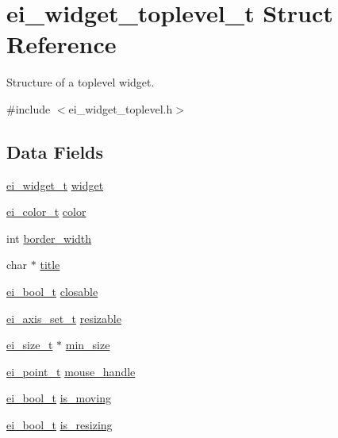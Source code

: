 \hypertarget{structei__widget__toplevel__t}{\section{ei\-\_\-widget\-\_\-toplevel\-\_\-t Struct Reference}
\label{structei__widget__toplevel__t}
}


Structure of a toplevel widget.  




{\ttfamily \#include $<$ei\-\_\-widget\-\_\-toplevel.\-h$>$}

\subsection*{Data Fields}
\begin{DoxyCompactItemize}
\item 
\hyperlink{structei__widget__t}{ei\-\_\-widget\-\_\-t} \hyperlink{structei__widget__toplevel__t_a3babaea121cf413ae2020cea768479b0}{widget}
\item 
\hyperlink{structei__color__t}{ei\-\_\-color\-\_\-t} \hyperlink{structei__widget__toplevel__t_a4004d31b3b9d5e6a2f80bca288c1c31b}{color}
\item 
int \hyperlink{structei__widget__toplevel__t_ac3487d8274c78d4bb79a34d98d54f86e}{border\-\_\-width}
\item 
char $\ast$ \hyperlink{structei__widget__toplevel__t_a2dba56e4fa0df714a546e4175fe3563e}{title}
\item 
\hyperlink{ei__types_8h_a383b9af13bd6a0a893096ead3c4d8e28}{ei\-\_\-bool\-\_\-t} \hyperlink{structei__widget__toplevel__t_a3e8fb2c934a21fd631ddbe2c8ff272db}{closable}
\item 
\hyperlink{ei__types_8h_ab5d9ff46ba9b2c9fa6d6fbd2594c6439}{ei\-\_\-axis\-\_\-set\-\_\-t} \hyperlink{structei__widget__toplevel__t_a2959bf91c46bfbf8772cd7974168fd1b}{resizable}
\item 
\hyperlink{structei__size__t}{ei\-\_\-size\-\_\-t} $\ast$ \hyperlink{structei__widget__toplevel__t_afe0e3eb72d1504e32f13a163a51d5149}{min\-\_\-size}
\item 
\hyperlink{structei__point__t}{ei\-\_\-point\-\_\-t} \hyperlink{structei__widget__toplevel__t_a09141dc307e150d83b8cbd79e05d69a1}{mouse\-\_\-handle}
\item 
\hyperlink{ei__types_8h_a383b9af13bd6a0a893096ead3c4d8e28}{ei\-\_\-bool\-\_\-t} \hyperlink{structei__widget__toplevel__t_afb3d20f90a5fcb74aa165cd4ed809c84}{is\-\_\-moving}
\item 
\hyperlink{ei__types_8h_a383b9af13bd6a0a893096ead3c4d8e28}{ei\-\_\-bool\-\_\-t} \hyperlink{structei__widget__toplevel__t_ab2b3a8a4eb570dce16b3c153d2db8bad}{is\-\_\-resizing}
\end{DoxyCompactItemize}


